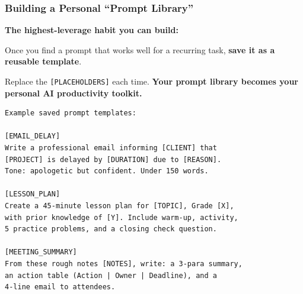 \begin{frame}[fragile]\frametitle{Building a Personal ``Prompt Library''}

\textbf{The highest-leverage habit you can build:}

\medskip
Once you find a prompt that works well for a recurring task, \textbf{save it as a reusable template}.

\medskip
Replace the \texttt{[PLACEHOLDERS]} each time. \textbf{Your prompt library becomes your personal AI productivity toolkit.}

\begin{lstlisting}[language=HTML]
Example saved prompt templates:

[EMAIL_DELAY]
Write a professional email informing [CLIENT] that 
[PROJECT] is delayed by [DURATION] due to [REASON]. 
Tone: apologetic but confident. Under 150 words.

[LESSON_PLAN]  
Create a 45-minute lesson plan for [TOPIC], Grade [X], 
with prior knowledge of [Y]. Include warm-up, activity, 
5 practice problems, and a closing check question.

[MEETING_SUMMARY]
From these rough notes [NOTES], write: a 3-para summary, 
an action table (Action | Owner | Deadline), and a 
4-line email to attendees.
\end{lstlisting}



\end{frame}





